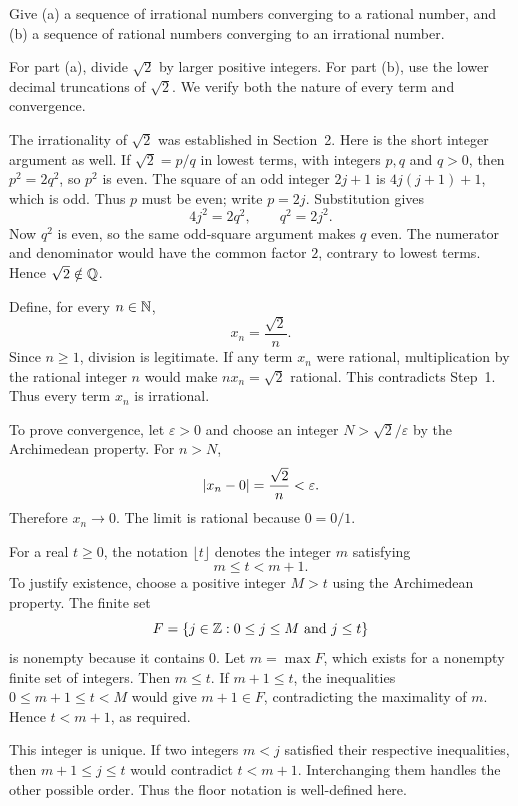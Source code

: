 \goal Give \textup{(a)} a sequence of irrational numbers converging to a
rational number, and \textup{(b)} a sequence of rational numbers
converging to an irrational number.

\idea For part \textup{(a)}, divide $\sqrt2$ by larger positive integers.
For part \textup{(b)}, use the lower decimal truncations of $\sqrt2$.
We verify both the nature of every term and convergence.

The irrationality of $\sqrt2$ was established in Section~2.
Here is the short integer argument as well. If
$\sqrt2=p/q$ in lowest terms, with integers $p,q$ and $q>0$,
then $p^2=2q^2$, so $p^2$ is even. The square of an odd integer
$2j+1$ is $4j(j+1)+1$, which is odd. Thus $p$ must be even;
write $p=2j$. Substitution gives
\[
 4j^2=2q^2,\qquad q^2=2j^2.
\]
Now $q^2$ is even, so the same odd-square argument makes $q$ even.
The numerator and denominator would have the common factor $2$,
contrary to lowest terms. Hence $\sqrt2\notin\mathbb{Q}$.

Define, for every $n\in\mathbb{N}$,
\[
 x_n=\frac{\sqrt2}{n}.
\]
Since $n\ge1$, division is legitimate. If any term $x_n$ were
rational, multiplication by the rational integer $n$ would make
$nx_n=\sqrt2$ rational. This contradicts Step~1.
Thus every term $x_n$ is irrational.

To prove convergence, let $\varepsilon>0$ and choose an integer
$N>\sqrt2/\varepsilon$ by the Archimedean property. For $n>N$,
\[
 \left|x_n-0\right|=\frac{\sqrt2}{n}<\varepsilon.
\]
Therefore $x_n\to0$. The limit is rational because $0=0/1$.

For a real $t\ge0$, the notation $\lfloor t\rfloor$ denotes the
integer $m$ satisfying
\[
 m\le t<m+1.
\]
To justify existence, choose a positive integer $M>t$ using the
Archimedean property. The finite set
\[
 F=\{j\in\mathbb{Z}:0\le j\le M\text{ and }j\le t\}
\]
is nonempty because it contains $0$. Let $m=\max F$, which exists
for a nonempty finite set of integers. Then $m\le t$.
If $m+1\le t$, the inequalities
$0\le m+1\le t<M$ would give $m+1\in F$, contradicting the
maximality of $m$. Hence $t<m+1$, as required.

This integer is unique. If two integers $m<j$ satisfied their
respective inequalities, then $m+1\le j\le t$ would contradict
$t<m+1$. Interchanging them handles the other possible order.
Thus the floor notation is well-defined here.


